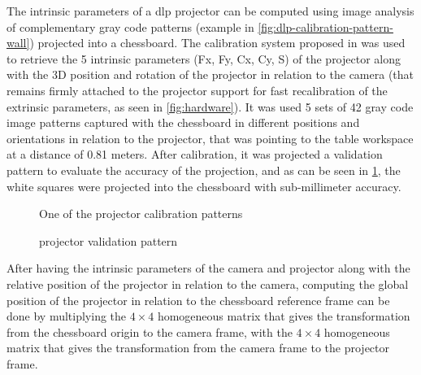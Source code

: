 The intrinsic parameters of a \gls{dlp} projector can be computed using image analysis of complementary gray code patterns (example in \cref{fig:dlp-calibration-pattern-wall}) projected into a chessboard. The calibration system proposed in \cite{Moreno2012} was used to retrieve the 5 intrinsic parameters (Fx, Fy, Cx, Cy, S) of the projector along with the 3D position and rotation of the projector in relation to the camera (that remains firmly attached to the projector support for fast recalibration of the extrinsic parameters, as seen in \cref{fig:hardware}). It was used 5 sets of 42 gray code image patterns captured with the chessboard in different positions and orientations in relation to the projector, that was pointing to the table workspace at a distance of 0.81 meters. After calibration, it was projected a validation pattern to evaluate the accuracy of the projection, and as can be seen in \cref{fig:dlp-projected-chessboard}, the white squares were projected into the chessboard with sub-millimeter accuracy.

\begin{figure}[H]
	\begin{floatrow}[2]
		{\caption{One of the  projector calibration patterns}\label{fig:dlp-calibration-pattern-wall}}
		{\caption{ projector validation pattern}\label{fig:dlp-projected-chessboard}}
	\end{floatrow}
\end{figure}

After having the intrinsic parameters of the camera and projector along with the relative position of the projector in relation to the camera, computing the global position of the projector in relation to the chessboard reference frame can be done by multiplying the $4 \times 4$ homogeneous matrix that gives the transformation from the chessboard origin to the camera frame, with the $4 \times 4$ homogeneous matrix that gives the transformation from the camera frame to the projector frame.



